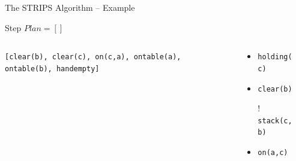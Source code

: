 \documentclass[presentation]{beamer}\mode<presentation>{\usetheme{AMSBolognaFC}}
\begin{document}
\begin{frame}[c]{The STRIPS Algorithm -- Example}
\small

	\begin{exampleblock}{Step \nextStripsExampleStep{} \hfill $Plan = []$}
		\begin{columns}[t]
			\begin{column}{.30\linewidth}\centering
				\texttt{[clear(b), clear(c), on(c,a), ontable(a), ontable(b), handempty]}
			\end{column}
			\begin{column}{.50\linewidth}\centering
				\begin{itemize}
					\item \texttt{holding(c)}
					\item \texttt{clear(b)}
					\item[!] \texttt{stack(c,b)}
					\item \texttt{on(a,c)}
				\end{itemize}
			\end{column}
			\begin{column}{.10\linewidth}\centering
				
			\end{column}
		\end{columns}
	\end{exampleblock}

\end{frame}
\end{document}
